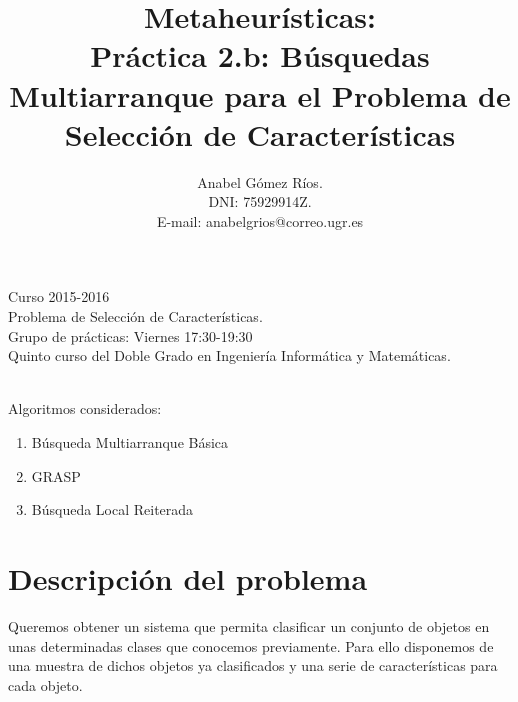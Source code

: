 \documentclass[12pt]{article}
\title{Metaheur\'isticas:\\
 Pr\'actica 2.b: B\'usquedas Multiarranque para el Problema de Selección de Características}
\author{Anabel G\'omez R\'ios.\\
 DNI: 75929914Z.\\
 E-mail: anabelgrios@correo.ugr.es}
\begin{document}
\maketitle

\begin{center}
Curso 2015-2016\\

Problema de Selección de Características.\\ 

Grupo de prácticas: Viernes 17:30-19:30\\

Quinto curso del Doble Grado en Ingeniería Informática y Matemáticas.\\
\textit{ }\\
\end{center}

Algoritmos considerados:
\begin{enumerate}
\item Búsqueda Multiarranque Básica
\item GRASP
\item Búsqueda Local Reiterada
\end{enumerate}

\newpage

\tableofcontents

\newpage

\section{Descripción del problema}
Queremos obtener un sistema que permita clasificar un conjunto de objetos en unas determinadas clases que conocemos previamente. Para ello disponemos de una muestra de dichos objetos ya clasificados y una serie de características para cada objeto.\\
\end{document}
